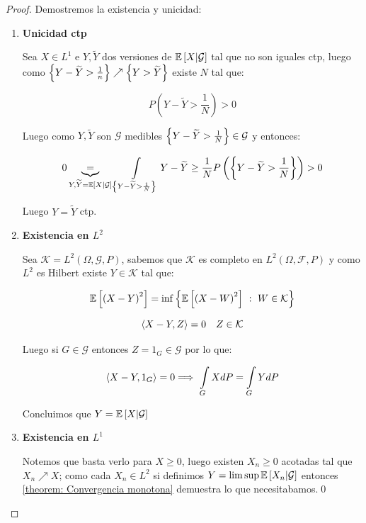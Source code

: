\begin{proof}
	Demostremos la existencia y unicidad:
	
	\begin{enumerate}
		\item {\textbf{Unicidad ctp}}
		
		Sea $X \in L^1$ e $Y,\widetilde{Y}$ dos versiones de $\mathbb{E} \left[X \vert \mathcal{G}\right]$ tal que no son iguales ctp, luego como $\left\lbrace Y - \widetilde{Y} > \frac{1}{n}\right\rbrace \nearrow \left\lbrace Y > \widetilde{Y}\right\rbrace$ existe $N$ tal que:
		
		\begin{equation*}
			P\left(Y - \widetilde{Y} > \frac{1}{N}\right) > 0
		\end{equation*}
		
		Luego como $Y, \widetilde{Y}$ son $\mathcal{G}$ medibles $\left\lbrace Y - \widetilde{Y} > \frac{1}{N}\right\rbrace \in \mathcal{G}$ y entonces:
		
		\begin{equation*}
			0 \underbrace{=}_{Y,\widetilde{Y} = \mathbb{E} \left[X \vert \mathcal{G}\right]} \int\limits_{\left\lbrace Y - \widetilde{Y} > \frac{1}{N}\right\rbrace} {Y - \widetilde{Y}} \geq \frac{1}{N} P \left(\left\lbrace Y - \widetilde{Y} > \frac{1}{N}\right\rbrace\right) > 0
		\end{equation*}
		
		Luego $Y = \widetilde{Y}$ ctp.
		
		\item {\textbf{Existencia en $L^2$}}
		
		Sea $\mathcal{K} = L^2(\Omega, \mathcal{G}, P)$, sabemos que $\mathcal{K} $ es completo en $L^2(\Omega, \mathcal{F}, P)$ y como $L^2$ es Hilbert existe $Y \in \mathcal{K} $ tal que:
		
		\begin{equation*}
			\mathbb{E} \left[\left(X - Y \right)^2\right] = \inf \left\lbrace\mathbb{E} \left[\left(X - W \right)^2\right] ~:~ W \in \mathcal{K}\right\rbrace
		\end{equation*}
		
		\begin{equation*}
			\left\langle X-Y, Z\right\rangle = 0 \quad Z \in \mathcal{K}
		\end{equation*}
		
		Luego si $G \in \mathcal{G}$ entonces $Z = 1_{G} \in \mathcal{G}$ por lo que:
		
		\begin{equation*}
			\ip{X-Y, 1_G} = 0 \Longrightarrow \ \int\limits_{G} {XdP} = \int\limits_{G}{Y dP}
		\end{equation*}
		
		Concluimos que $Y = \mathbb{E} \left[X \vert \mathcal{G}\right]$
		
		\item {\textbf{Existencia en $L^1$}}		
		
		Notemos que basta verlo para $X \geq 0$, luego existen $X_n \geq 0$ acotadas tal que $X_n \nearrow X$; como cada $X_n \in L^2$ si definimos $Y = \limsup \mathbb{E} \left[X_n \vert \mathcal{G}\right]$ entonces \ref{theorem: Convergencia monotona} demuestra lo que necesitabamos.\qed
		
	\end{enumerate}
	
\end{proof}


